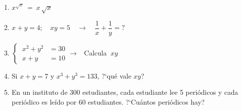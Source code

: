 \vspace{5mm}
\begin{enumerate}
\item	$x^{\sqrt{x}}\ = \ x\, \sqrt{x}$

\vspace{-6mm}
\begin{flushright}
\begin{footnotesize} \textcolor{gris}{}	\end{footnotesize}
\end{flushright}

\item	$x+y=4;\quad xy=5 \quad \to \quad \dfrac 1 x + \dfrac 1 y = ?$

\vspace{-6mm}
\begin{flushright}
\begin{footnotesize} \textcolor{gris}{}	\end{footnotesize}
\end{flushright}

\item	$	\begin{cases} \ x^2+y^2&=30 \\ \ x+y&= 10 \end{cases} \to \ \ $ Calcula $\ xy$

\vspace{-6mm}
\begin{flushright}
\begin{footnotesize} \textcolor{gris}{}	\end{footnotesize}
\end{flushright}

\item	Si $x+y=7$ y $x^3+y^3=133$, ?`qué vale $xy$?

\vspace{-6mm}
\begin{flushright}
\begin{scriptsize} \textcolor{gris}{}	\end{scriptsize}
\end{flushright}


\item	En un instituto de 300 estudiantes, cada estudiante lee 5 periódicos y cada periódico es leído por 60 estudiantes. ?`Cuántos periódicos hay?


\end{enumerate}

